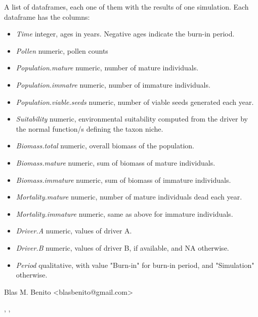 \documentclass[letterpaper]{book}
\begin{document}
%
\begin{Value}
A list of dataframes, each one of them with the results of one simulation. Each dataframe has the columns:
\begin{itemize}

\item \emph{Time} integer, ages in years. Negative ages indicate the burn-in period.
\item \emph{Pollen} numeric, pollen counts
\item \emph{Population.mature} numeric, number of mature individuals.
\item \emph{Population.immatre} numeric, number of immature individuals.
\item \emph{Population.viable.seeds} numeric, number of viable seeds generated each year.
\item \emph{Suitability} numeric, environmental suitability computed from the driver by the normal function/s defining the taxon niche.
\item \emph{Biomass.total} numeric, overall biomass of the population.
\item \emph{Biomass.mature} numeric, sum of biomass of mature individuals.
\item \emph{Biomass.immature} numeric, sum of biomass of immature individuals.
\item \emph{Mortality.mature} numeric, number of mature individuals dead each year.
\item \emph{Mortality.immature} numeric, same as above for immature individuals.
\item \emph{Driver.A} numeric, values of driver A.
\item \emph{Driver.B} numeric, values of driver B, if available, and NA otherwise.
\item \emph{Period} qualitative, with value "Burn-in" for burn-in period, and "Simulation" otherwise.

\end{itemize}

\end{Value}
%
\begin{Author}\relax
Blas M. Benito  <blasbenito@gmail.com>
\end{Author}
%
\begin{SeeAlso}\relax
{}, , 
\end{SeeAlso}
%
\end{document}
